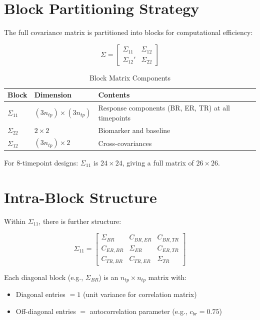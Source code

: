 \documentclass[11pt]{article}
\theoremstyle{definition}
\begin{document}
\section{Block Partitioning Strategy}

The full covariance matrix is partitioned into blocks for computational
efficiency:

\begin{equation}
\Sigma = \begin{bmatrix}
\Sigma_{11} & \Sigma_{12} \\
\Sigma_{12}' & \Sigma_{22}
\end{bmatrix}
\end{equation}

\begin{table}[h]
\centering
\caption{Block Matrix Components}
\begin{tabular}{@{}lll@{}}
\toprule
\textbf{Block} & \textbf{Dimension} & \textbf{Contents} \\
\midrule
$\Sigma_{11}$ & $(3n_{tp}) \times (3n_{tp})$ & Response components (BR, ER, TR) at all timepoints \\
$\Sigma_{22}$ & $2 \times 2$ & Biomarker and baseline \\
$\Sigma_{12}$ & $(3n_{tp}) \times 2$ & Cross-covariances \\
\bottomrule
\end{tabular}
\end{table}

For 8-timepoint designs: $\Sigma_{11}$ is $24 \times 24$, giving a full matrix
of $26 \times 26$.

\section{Intra-Block Structure}

Within $\Sigma_{11}$, there is further structure:

\begin{equation}
\Sigma_{11} = \begin{bmatrix}
\Sigma_{BR} & C_{BR,ER} & C_{BR,TR} \\
C_{ER,BR} & \Sigma_{ER} & C_{ER,TR} \\
C_{TR,BR} & C_{TR,ER} & \Sigma_{TR}
\end{bmatrix}
\end{equation}

Each diagonal block (e.g., $\Sigma_{BR}$) is an $n_{tp} \times n_{tp}$ matrix with:
\begin{itemize}
    \item Diagonal entries $= 1$ (unit variance for correlation matrix)
    \item Off-diagonal entries $=$ autocorrelation parameter (e.g., $c_{br} = 0.75$)
\end{itemize}
\end{document}
